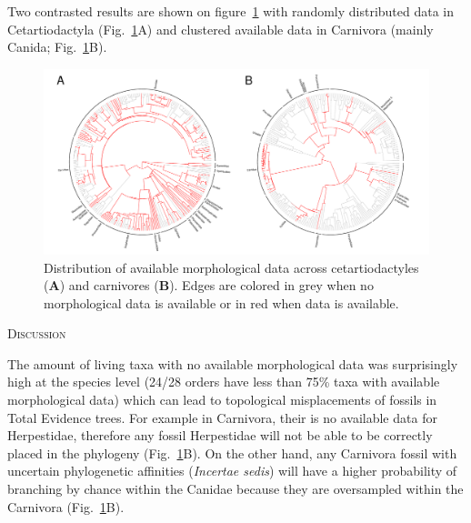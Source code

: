 \documentclass[12pt,letterpaper]{article}
\renewcommand{\section}[1]{%
\bigskip
\begin{center}
\begin{Large}
\normalfont\scshape #1
\medskip
\end{Large}
\end{center}}
\renewcommand{\subsection}[1]{%
\bigskip
\begin{center}
\begin{large}
\normalfont\itshape #1
\end{large}
\end{center}}
\begin{document}
Two contrasted results are shown on figure~\ref{Figure_example_coverage} with randomly distributed data in Cetartiodactyla (Fig.~\ref{Figure_example_coverage}A) and clustered available data in Carnivora (mainly Canida; Fig.~\ref{Figure_example_coverage}B). 
\begin{figure}[!htbp]
\centering
    \includegraphics[width=1\textwidth]{example_coverage.pdf}
\caption{Distribution of available morphological data across cetartiodactyles (\textbf{A}) and carnivores (\textbf{B}). Edges are colored in grey when no morphological data is available or in red when data is available.}
\label{Figure_example_coverage}
\end{figure}



%
%

\section{Discussion}

The amount of living taxa with no available morphological data was surprisingly high at the species level (24/28 orders have less than 75\% taxa with available morphological data) which can lead to topological misplacements of fossils in Total Evidence trees. For example in Carnivora, their is no available data for Herpestidae, therefore any fossil Herpestidae will not be able to be correctly placed in the phylogeny (Fig.~\ref{Figure_example_coverage}B). On the other hand, any Carnivora fossil with uncertain phylogenetic affinities (\textit{Incertae sedis}) will have a higher probability of branching by chance within the Canidae because they are oversampled within the Carnivora (Fig.~\ref{Figure_example_coverage}B).
\end{document}
